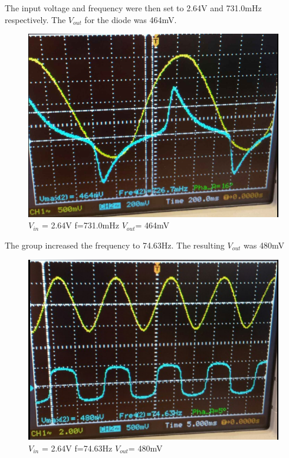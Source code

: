 \documentclass[twocolumn, amsmath]{revtex4}
\begin{document}
The input voltage and frequency were then set to 2.64V and 731.0mHz respectively. The $V_{out}$ for the diode was 464mV.

\begin{figure}
    \includegraphics[scale=0.3]{464mV.png}  
    \caption{$V_{in}$ = 2.64V f=731.0mHz $V_{out}$= 464mV}
\end{figure}


The group increased the frequency to 74.63Hz. The resulting $V_{out}$ was 480mV

\begin{figure}
    \includegraphics[scale=0.3]{480mV.png}  
    \caption{$V_{in}$ = 2.64V f=74.63Hz $V_{out}$= 480mV}
\end{figure}
\end{document}
